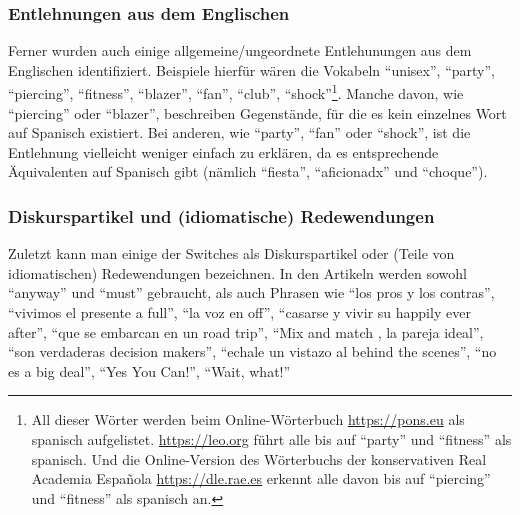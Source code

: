 \subsubsection{Entlehnungen aus dem Englischen}
Ferner wurden auch einige allgemeine/ungeordnete Entlehunungen aus dem Englischen identifiziert.
Beispiele hierfür wären die Vokabeln ``unisex'', ``party'', ``piercing'', ``fitness'', ``blazer'', ``fan'', ``club'', ``shock''\footnote{All dieser Wörter werden beim Online-Wörterbuch \url{https://pons.eu} als spanisch aufgelistet. \url{https://leo.org} führt alle bis auf ``party'' und ``fitness'' als spanisch. Und die Online-Version des Wörterbuchs der konservativen Real Academia Española \url{https://dle.rae.es} erkennt alle davon bis auf ``piercing'' und ``fitness'' als spanisch an.}.
Manche davon, wie ``piercing'' oder ``blazer'', beschreiben Gegenstände, für die es kein einzelnes Wort auf Spanisch existiert.
Bei anderen, wie ``party'', ``fan'' oder ``shock'',  ist die Entlehnung vielleicht weniger einfach zu erklären, da es entsprechende Äquivalenten auf Spanisch gibt (nämlich ``fiesta'', ``aficionadx'' und ``choque''). %

\subsubsection{Diskurspartikel und (idiomatische) Redewendungen}
Zuletzt kann man einige der Switches als Diskurspartikel oder (Teile von idiomatischen) Redewendungen bezeichnen.
In den Artikeln werden sowohl ``anyway'' und ``must'' gebraucht, als auch Phrasen wie ``los pros y los contras'', ``vivimos el presente a full'', ``la voz en off'', ``casarse y vivir su happily ever after'', ``que se embarcan en un road trip'', ``Mix and match , la pareja ideal'', ``son verdaderas decision makers'', ``echale un vistazo al behind the scenes'', ``no es a big deal'', ``Yes You Can!'', ``Wait, what!''

\begin{comment}
\begin{enumerate}
  \item English interjections as part of the Spanish text:
      ``me di quenta que wow!'', ``pense wow esto es lo que quiro''
  \item Whole phrases in English, not necessarily idiomatic %
  \item Misc: one English word without category at the moment
  \item Cool/slang/hip/life-style
      ``cool''
  \item Personal descriptions
      needy, creepy, charming
  \item Berufe/Stellenbezeichnungen: ``nanny'', ``babysitter'', ``dog walker'', ``coach de lifestyle''
  \item Electrodomestics
      ``juicer'' (in Klammern, next to the spanisch text), ``microwave''
\end{enumerate}
\end{comment}

